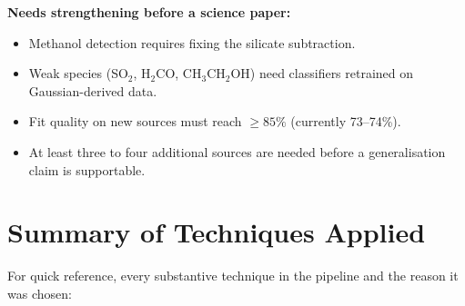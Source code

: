 \documentclass[11pt,a4paper]{article}
\begin{document}
\begin{goldbox}
\textbf{Needs strengthening before a science paper:}
\begin{itemize}
  \item Methanol detection requires fixing the silicate subtraction.
  \item Weak species (SO$_2$, H$_2$CO, CH$_3$CH$_2$OH) need classifiers
        retrained on Gaussian-derived data.
  \item Fit quality on new sources must reach $\ge 85\%$ (currently
        73--74\%).
  \item At least three to four additional sources are needed before a
        generalisation claim is supportable.
\end{itemize}
\end{goldbox}

\section{Summary of Techniques Applied}

For quick reference, every substantive technique in the pipeline and the
reason it was chosen:
\end{document}
